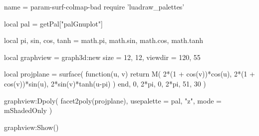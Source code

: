 \documentclass{standalone}
\begin{document}
\begin{luadraw}{name = param-surf-colmap-bad}
require 'luadraw_palettes'

local pal = getPal["palGnuplot"]

local pi, sin, cos, tanh = math.pi, math.sin, math.cos, math.tanh

local graphview = graph3d:new{
  size    = {12, 12},
  viewdir = {120, 55}
}

local projplane = surface(
  function(u, v)
    return M(
      2*(1 + cos(v))*cos(u),
      2*(1 + cos(v))*sin(u),
      2*sin(v)*tanh(u-pi)
    )
  end,
  0, 2*pi, 0,  2*pi,
  {51, 30}
)

graphview:Dpoly(
  facet2poly(projplane), 
  {
    usepalette = {pal, "z"},
    mode       = mShadedOnly
  }
)


graphview:Show()
\end{luadraw}
\end{document}
